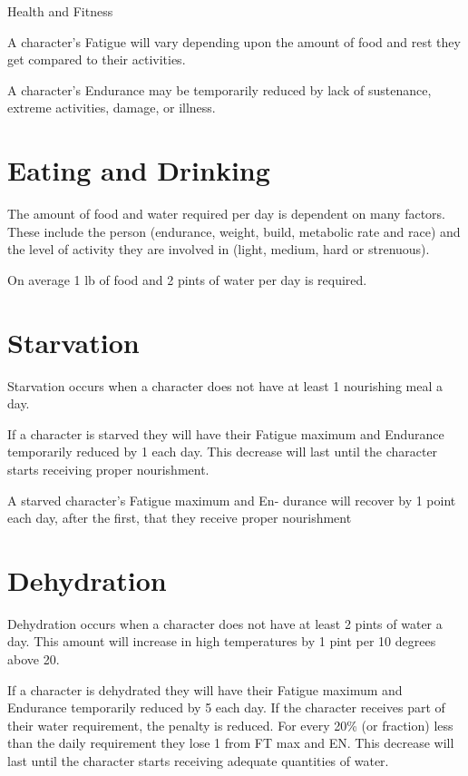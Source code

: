 \begin{Chapter}{Health and Fitness}

A character’s Fatigue will vary depending upon the amount of food and
rest they get compared to their activities.

A character’s Endurance may be temporarily reduced by lack of
sustenance, extreme activities, damage, or illness.

\section{Eating and Drinking}

The amount of food and water required per day is dependent on many
factors.  These include the person (endurance, weight, build,
metabolic rate and race) and the level of activity they are involved
in (light, medium, hard or strenuous).

On average 1 lb of food and 2 pints of water per day is required.


\section{Starvation}

Starvation occurs when a character does not have at least 1 nourishing
meal a day.

If a character is starved they will have their Fatigue maximum and
Endurance temporarily reduced by 1 each day. This decrease will last
until the character starts receiving proper nourishment.

A starved character’s Fatigue maximum and En- durance will recover by
1 point each day, after the first, that they receive proper
nourishment


\section{Dehydration}

Dehydration occurs when a character does not have at least 2 pints of
water a day.  This amount will increase in high temperatures by 1 pint
per 10 degrees above 20.

If a character is dehydrated they will have their Fatigue maximum and
Endurance temporarily reduced by 5 each day.  If the character
receives part of their water requirement, the penalty is reduced.
For every 20\% (or fraction) less than the daily requirement they lose
1 from FT max and EN. This decrease will last until the character
starts receiving adequate quantities of water.


\end{Chapter}
